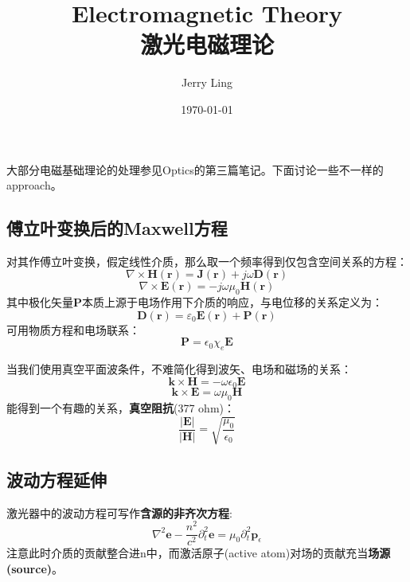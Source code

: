 \documentclass[12pt]{ctexart}%
\title{Electromagnetic Theory\\激光电磁理论}
\author{Jerry Ling}
\date{\today}
\begin{document}
\maketitle
大部分电磁基础理论的处理参见Optics的第三篇笔记。下面讨论一些不一样的approach。
\subsection*{傅立叶变换后的Maxwell方程}
对其作傅立叶变换，假定线性介质，那么取一个频率得到仅包含空间关系的方程：
\begin{equation}
    \nabla \times \textbf{H}(\textbf{r}) = \textbf{J}(\textbf{r})+j\omega\textbf{D}(\textbf{r})
\end{equation}
\begin{equation}
    \nabla \times \textbf{E}(\textbf{r}) = -j\omega\mu_0\textbf{H}(\textbf{r})
\end{equation}
其中极化矢量\textbf{P}本质上源于电场作用下介质的响应，与电位移的关系定义为：
\begin{equation}
    \textbf{D}(\textbf{r}) = \varepsilon_0\textbf{E}(\textbf{r})+\textbf{P}(\textbf{r})
\end{equation}
可用物质方程和电场联系：
\begin{equation}
    \textbf{P} = \epsilon_0\chi_e\textbf{E}
\end{equation}
\par 当我们使用真空平面波条件，不难简化得到波矢、电场和磁场的关系：
\begin{equation}
    \textbf{k}\times\textbf{H}=-\omega\epsilon_0\textbf{E}
\end{equation}
\begin{equation}
    \textbf{k}\times\textbf{E}=\omega\mu_0\textbf{H}
\end{equation}
能得到一个有趣的关系，\textbf{真空阻抗}(377 ohm)：
\begin{equation}
    \frac{|\textbf{E}|}{|\textbf{H}|} = \sqrt{\frac{\mu_0}{\epsilon_0}}
\end{equation}
\subsection*{波动方程延伸}
\par 激光器中的波动方程可写作\textbf{含源的非齐次方程}:
\begin{equation}
    \nabla^2\textbf{e}-\frac{n^2}{c^2}\partial_t^2\textbf{e}=\mu_0\partial_t^2\textbf{p}_{\epsilon}
\end{equation}
注意此时介质的贡献整合进n中，而激活原子(active atom)对场的贡献充当\textbf{场源(source)}。
\end{document}
